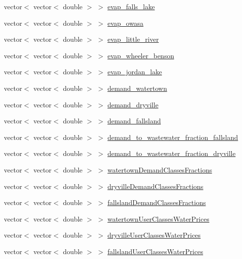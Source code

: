\begin{DoxyCompactItemize}
vector$<$ vector$<$ double $>$ $>$ \mbox{\hyperlink{classPaperTestProblem_a6ff2293ecad9cc169484376cd419c166}{evap\+\_\+falls\+\_\+lake}}
\item 
vector$<$ vector$<$ double $>$ $>$ \mbox{\hyperlink{classPaperTestProblem_a9feb0214e7f4840bf9ddd81d50473496}{evap\+\_\+owasa}}
\item 
vector$<$ vector$<$ double $>$ $>$ \mbox{\hyperlink{classPaperTestProblem_a546f7d60630162c03a980b233195bfbe}{evap\+\_\+little\+\_\+river}}
\item 
vector$<$ vector$<$ double $>$ $>$ \mbox{\hyperlink{classPaperTestProblem_a5e4e84230783614660cf17719a723eb0}{evap\+\_\+wheeler\+\_\+benson}}
\item 
vector$<$ vector$<$ double $>$ $>$ \mbox{\hyperlink{classPaperTestProblem_aed8a373010157bf691b3a7177288acdd}{evap\+\_\+jordan\+\_\+lake}}
\item 
vector$<$ vector$<$ double $>$ $>$ \mbox{\hyperlink{classPaperTestProblem_a79efa6cbc7f2bd003f70419fe6d45efd}{demand\+\_\+watertown}}
\item 
vector$<$ vector$<$ double $>$ $>$ \mbox{\hyperlink{classPaperTestProblem_a74c88139d65ef34aec2aa2111697c7be}{demand\+\_\+dryville}}
\item 
vector$<$ vector$<$ double $>$ $>$ \mbox{\hyperlink{classPaperTestProblem_acd6b67e6c12e3ef1ff2278f312888f4e}{demand\+\_\+fallsland}}
\item 
vector$<$ vector$<$ double $>$ $>$ \mbox{\hyperlink{classPaperTestProblem_a37afd20e40b7e6f26d229bc79221ea97}{demand\+\_\+to\+\_\+wastewater\+\_\+fraction\+\_\+fallsland}}
\item 
vector$<$ vector$<$ double $>$ $>$ \mbox{\hyperlink{classPaperTestProblem_a6641660439d10f0476f39ee28967edb5}{demand\+\_\+to\+\_\+wastewater\+\_\+fraction\+\_\+dryville}}
\item 
vector$<$ vector$<$ double $>$ $>$ \mbox{\hyperlink{classPaperTestProblem_a7808c1a9863d8188e4aa66cfd485ef0a}{watertown\+Demand\+Classes\+Fractions}}
\item 
vector$<$ vector$<$ double $>$ $>$ \mbox{\hyperlink{classPaperTestProblem_a3a8dfe7b057844b686eeb3bd4ad30c4b}{dryville\+Demand\+Classes\+Fractions}}
\item 
vector$<$ vector$<$ double $>$ $>$ \mbox{\hyperlink{classPaperTestProblem_a506bdb234395692f92fe0f7fee088c60}{fallsland\+Demand\+Classes\+Fractions}}
\item 
vector$<$ vector$<$ double $>$ $>$ \mbox{\hyperlink{classPaperTestProblem_a615952a6a9f19f58361037810a4d5903}{watertown\+User\+Classes\+Water\+Prices}}
\item 
vector$<$ vector$<$ double $>$ $>$ \mbox{\hyperlink{classPaperTestProblem_a2007d9d8030d96bf2147505265db4540}{dryville\+User\+Classes\+Water\+Prices}}
\item 
vector$<$ vector$<$ double $>$ $>$ \mbox{\hyperlink{classPaperTestProblem_acd8ca29e3e165f9008ee6be50e46b253}{fallsland\+User\+Classes\+Water\+Prices}}
\end{DoxyCompactItemize}
